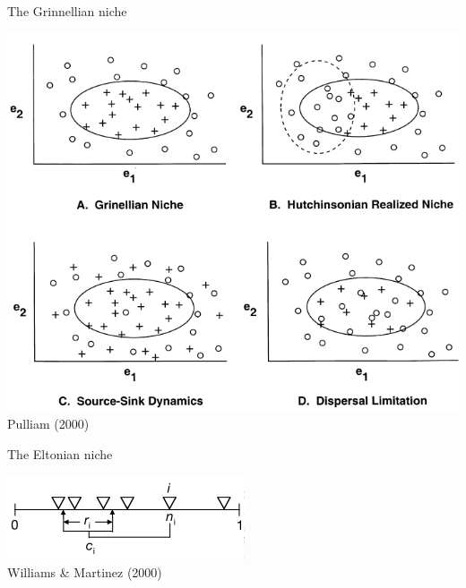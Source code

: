 \documentclass{eecslides}
\begin{document}
	\begin{frame}{The Grinnellian niche}
		\begin{center}
		\includegraphics[height=0.6\textheight]{pulliam}\\
		\footnotesize{Pulliam (2000)}
		\end{center}
	\end{frame}


	\begin{frame}{The Eltonian niche}
		\begin{center}
		\includegraphics[height=0.35\textheight]{martinez}\\
		\footnotesize{Williams \& Martinez (2000)}
		\end{center}
	\end{frame}


\end{document}
